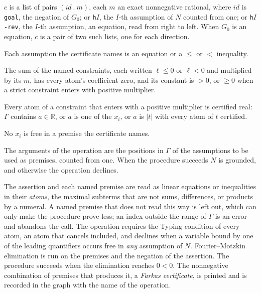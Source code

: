 \label{kop:ineq}%
\begin{VNBcond}
\item[Certificate] $c$ is a list of pairs $(\mathit{id}\ .\ m)$,
  each $m$ an exact nonnegative rational, where $\mathit{id}$ is
  \texttt{goal}, the negation of $G_0$; or \texttt{h}$I$, the $I$-th
  assumption of $N$ counted from one; or \texttt{h}$I$\texttt{-rev}, the
  $I$-th assumption, an equation, read from right to left.  When $G_0$
  is an equation, $c$ is a pair of two such lists, one for each
  direction.
\item[Premises] Each assumption the certificate names is an equation or
  a $\leq$ or $<$ inequality.
\item[Absurdity] The sum of the named constraints, each written
  $\ell \leq 0$ or $\ell < 0$ and multiplied by its $m$, has every atom's
  coefficient zero, and its constant is $> 0$, or $\geq 0$ when a strict
  constraint enters with positive multiplier.
\item[Typing] Every atom of a constraint that enters with a positive
  multiplier is certified real: $\Gamma$ contains $a \in \mathbb{R}$, or $a$ is one of the
  $x_i$, or $a$ is $|t|$ with every atom of $t$ certified.
\item[Eigenvariable] No $x_i$ is free in a premise the certificate
  names.
\end{VNBcond}
The arguments of the operation are the positions in $\Gamma$ of the
assumptions to be used as premises, counted from one.  When the
procedure succeeds $N$ is grounded, and otherwise the operation
declines.

The assertion and each named premise are read as linear equations or
inequalities in their \emph{atoms}, the maximal subterms that are not
sums, differences, or products by a numeral.  A named premise that does
not read this way is left out, which can only make the procedure prove
less; an index outside the range of $\Gamma$ is an error and abandons the
call.  The operation requires the Typing condition of every atom, an
atom that cancels included, and declines when a variable bound by one of
the leading quantifiers occurs free in \emph{any} assumption of $N$.
Fourier--Motzkin elimination is run on the premises and the negation of
the assertion.  The procedure succeeds when the elimination reaches
$0 < 0$.  The nonnegative combination of premises that produces it, a
\emph{Farkas certificate}, is printed and is recorded in the graph with
the name of the operation.

